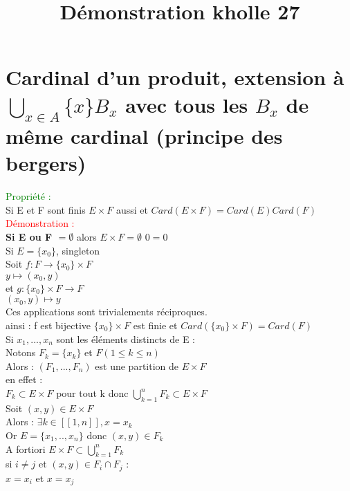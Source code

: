 \documentclass{article}
\begin{document}
\title{Démonstration kholle 27}
\date{}
\maketitle
\renewcommand{\thesection}{\Roman{section}}
\setlength{\parindent}{1.5cm}
\section{Cardinal d'un produit, extension à $\bigcup_{x\in A} \lbrace x \rbrace B_x$ avec tous les $B_x$ de  même cardinal (principe des bergers)}
\textcolor{green}{Propriété :} \\
Si E et F sont finis $E \times F $ aussi et $Card(E \times F)= Card(E) Card(F)$ \\
\textcolor{red}{Démonstration :} \\
{\bf \boldmath Si E ou F $= \emptyset$} alors $E \times F= \emptyset$ $0=0$ \\
Si $E= \lbrace x_0 \rbrace$, singleton \\
Soit $f: F \rightarrow \lbrace x_0 \rbrace \times F $ \\
$y \mapsto (x_0,y)$ \\
et $g : \lbrace x_0 \rbrace \times F \rightarrow F$ \\
$(x_0,y) \mapsto y$ \\
Ces applications sont trivialements réciproques. \\
ainsi : f est bijective $\lbrace x_0 \rbrace \times F$ est finie et $Card(\lbrace x_0 \rbrace \times F)= Card(F) $ \\
Si $x_1,..., x_n$ sont les éléments distincts de E : \\
Notons $F_k= \lbrace x_k \rbrace $ et $F(1 \leq k \leq n)$ \\
Alors : $(F_1,...,F_n)$ est une partition de $E \times F$ \\
en effet : \\
$F_k \subset E \times F$ pour tout k donc $\bigcup_{k=1}^n F_k \subset E \times F$ \\
Soit $(x,y) \in E \times F$ \\
Alors : $\exists k \in [[1,n]],x=x_k$ \\
Or $E= \lbrace x_1,..,x_n \rbrace $ donc $(x,y) \in F_k$ \\
A fortiori  $E \times F \subset \bigcup_{k=1}^n F_k$ \\
si $i \neq j$ et $(x,y) \in F_i \cap F_j$ : \\
$x=x_i$ et $x=x_j$ \\
\end{document}
